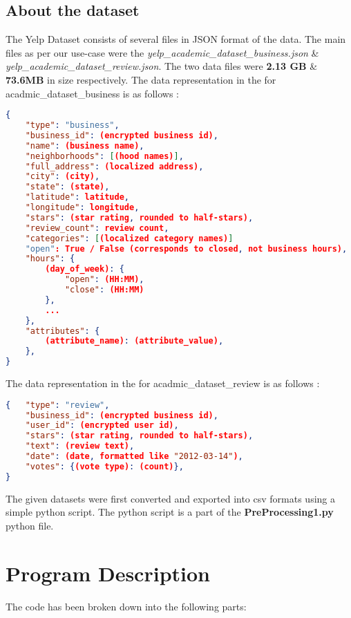 \documentclass[paper=a4, fontsize=11pt]{scrartcl} %
\numberwithin{equation}{section} %
\numberwithin{figure}{section} %
\numberwithin{table}{section} %
\begin{document}
\subsection{About the dataset}
The Yelp Dataset consists of several files in JSON format of the data. The main files as per our use-case were the \textit{yelp\_academic\_dataset\_business.json} \& \textit{yelp\_academic\_dataset\_review.json}. The two data files were \textbf{2.13 GB} \& \textbf{73.6MB} in size respectively. The data representation in the for acadmic\_dataset\_business is as follows : \\
\begin{lstlisting}[language=json]
{
    "type": "business",
    "business_id": (encrypted business id),
    "name": (business name),
    "neighborhoods": [(hood names)],
    "full_address": (localized address),
    "city": (city),
    "state": (state),
    "latitude": latitude,
    "longitude": longitude,
    "stars": (star rating, rounded to half-stars),
    "review_count": review count,
    "categories": [(localized category names)]
    "open": True / False (corresponds to closed, not business hours),
    "hours": {
        (day_of_week): {
            "open": (HH:MM),
            "close": (HH:MM)
        },
        ...
    },
    "attributes": {
        (attribute_name): (attribute_value),
    },
}
\end{lstlisting}
The data representation in the for acadmic\_dataset\_review is as follows : \\
\begin{lstlisting}[language=json]
{   "type": "review",
    "business_id": (encrypted business id),
    "user_id": (encrypted user id),
    "stars": (star rating, rounded to half-stars),
    "text": (review text),
    "date": (date, formatted like "2012-03-14"),
    "votes": {(vote type): (count)},
}
\end{lstlisting}
The given datasets were first converted and exported into csv formats using a simple python script. The python script is a part of the \textbf{PreProcessing1.py} python file.


\section{Program Description}
The code has been broken down into the following parts:
\end{document}
